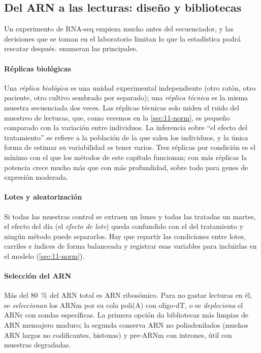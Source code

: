 \subsection{Del ARN a las lecturas: diseño y bibliotecas}

Un experimento de RNA-seq empieza mucho antes del secuenciador, y las decisiones que se toman en el laboratorio limitan lo que la estadística podrá rescatar después. \textcite{c11-conesa2016} enumeran las principales.

\paragraph{Réplicas biológicas} Una \emph{réplica biológica} es una unidad experimental independiente (otro ratón, otro paciente, otro cultivo sembrado por separado); una \emph{réplica técnica} es la misma muestra secuenciada dos veces. Las réplicas técnicas solo miden el ruido del muestreo de lecturas, que, como veremos en la \cref{sec:11-norm}, es pequeño comparado con la variación entre individuos. La inferencia sobre ``el efecto del tratamiento'' se refiere a la población de la que salen los individuos, y la única forma de estimar su variabilidad es tener varios. Tres réplicas por condición es el mínimo con el que los métodos de este capítulo funcionan; con más réplicas la potencia crece mucho más que con más profundidad, sobre todo para genes de expresión moderada.

\paragraph{Lotes y aleatorización} Si todas las muestras control se extraen un lunes y todas las tratadas un martes, el efecto del día (el \emph{efecto de lote}) queda confundido con el del tratamiento y ningún método puede separarlos. Hay que repartir las condiciones entre lotes, carriles e índices de forma balanceada y registrar esas variables para incluirlas en el modelo (\cref{sec:11-norm}).

\paragraph{Selección del ARN} Más del \SI{80}{\percent} del ARN total es ARN ribosómico. Para no gastar lecturas en él, se \emph{seleccionan} los ARNm por su cola poli(A) con oligo-dT, o se \emph{depleciona} el ARNr con sondas específicas. La primera opción da bibliotecas más limpias de ARN mensajero maduro; la segunda conserva ARN no poliadenilados (muchos ARN largos no codificantes, histonas) y pre-ARNm con intrones, útil con muestras degradadas.

